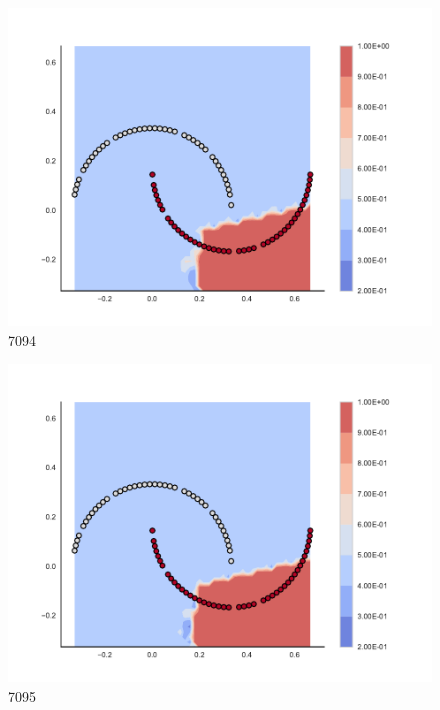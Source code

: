 \begin{subfigure}[b]{0.09\textwidth}
    \includegraphics[clip, trim=2.35cm 1.75cm 4.5cm 0cm,width=\textwidth]{img/convergence/7094.pdf}
    \caption{7094}
    \label{fig:convergence_7094}
\end{subfigure}
%
\begin{subfigure}[b]{0.09\textwidth}
    \includegraphics[clip, trim=2.35cm 1.75cm 4.5cm 0cm,width=\textwidth]{img/convergence/7095.pdf}
    \caption{7095}
    \label{fig:convergence_7095}
\end{subfigure}
%
